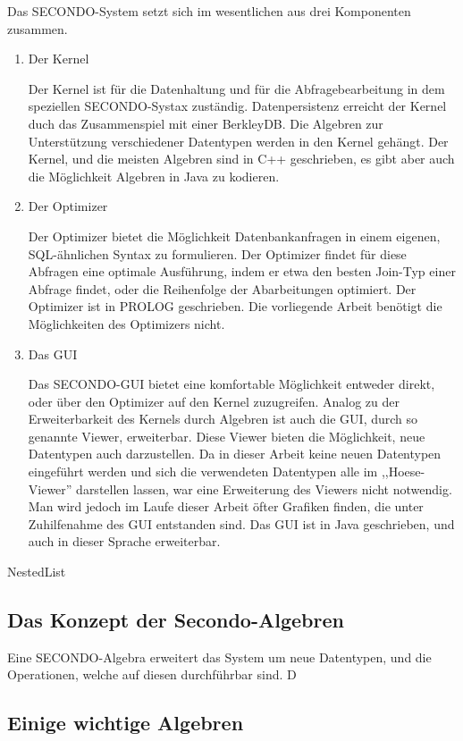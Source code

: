 Das SECONDO-System setzt sich im wesentlichen aus drei Komponenten zusammen.
\begin{enumerate}
\item Der Kernel

Der Kernel ist für die Datenhaltung und für die Abfragebearbeitung in dem speziellen SECONDO-Systax zuständig. Datenpersistenz erreicht der Kernel duch das Zusammenspiel mit einer BerkleyDB. Die Algebren zur Unterstützung verschiedener Datentypen werden in den Kernel gehängt. Der Kernel, und die meisten Algebren sind in C++ geschrieben, es gibt aber auch die Möglichkeit Algebren in Java zu kodieren.

\item Der Optimizer

Der Optimizer bietet die Möglichkeit Datenbankanfragen in einem eigenen, SQL-ähnlichen Syntax zu formulieren. Der Optimizer findet für diese Abfragen eine optimale Ausführung, indem er etwa den besten Join-Typ einer Abfrage findet, oder die Reihenfolge der Abarbeitungen optimiert. Der Optimizer ist in PROLOG geschrieben. Die vorliegende Arbeit benötigt die Möglichkeiten des Optimizers nicht.

\item Das GUI

Das SECONDO-GUI bietet eine komfortable Möglichkeit entweder direkt, oder  über den Optimizer  auf den Kernel zuzugreifen. Analog zu der Erweiterbarkeit des Kernels durch Algebren ist auch die GUI, durch so genannte Viewer, erweiterbar. Diese Viewer bieten die Möglichkeit, neue Datentypen auch darzustellen. Da in dieser Arbeit keine neuen Datentypen eingeführt werden und sich die verwendeten Datentypen alle im ,,Hoese-Viewer'' darstellen lassen, war eine Erweiterung des Viewers nicht notwendig. Man wird jedoch im Laufe dieser Arbeit öfter Grafiken finden, die unter Zuhilfenahme des GUI entstanden sind. Das GUI ist in Java geschrieben, und auch in dieser Sprache erweiterbar.

\end{enumerate}
NestedList

\subsection{Das Konzept der Secondo-Algebren}

Eine SECONDO-Algebra erweitert das System um neue Datentypen, und die Operationen, welche auf diesen durchführbar sind. D


\subsection{Einige wichtige Algebren}

